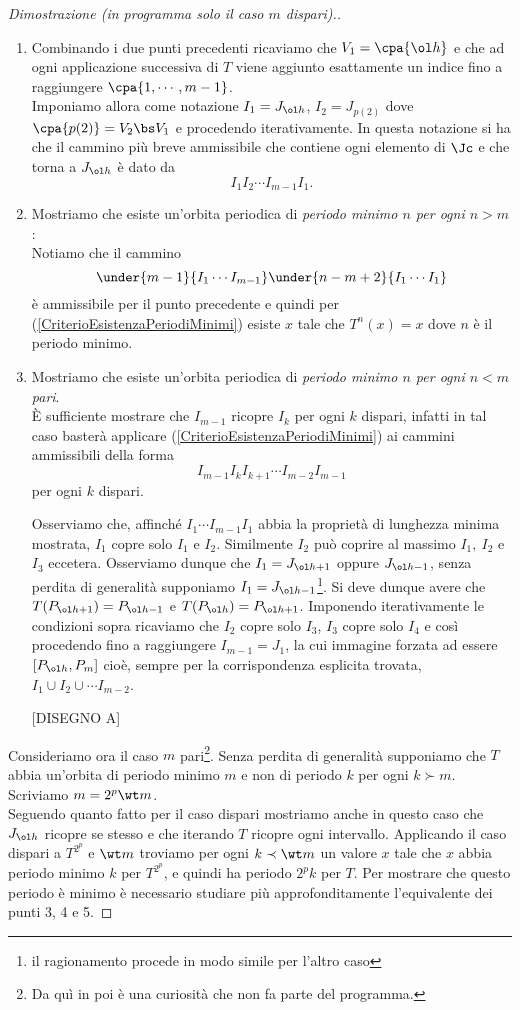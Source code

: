 \begin{proof}[Dimostrazione (in programma solo il caso $m$ dispari).]
\begin{enumerate}
\item Combinando i due punti precedenti ricaviamo che $V_1=\cpa{\ol h}$ e che ad ogni applicazione successiva di $T$ viene aggiunto esattamente un indice fino a raggiungere $\cpa{1,\cdots, m-1}$.\\
Imponiamo allora come notazione $I_1=J_{\ol h}$, $I_2=J_{p(2)}$ dove $\cpa{p(2)}=V_2\bs V_1$ e procedendo iterativamente. In questa notazione si ha che il cammino pi\`u breve ammissibile che contiene ogni elemento di $\Jc$ e che torna a $J_{\ol h}$ \`e dato da
\[I_1I_2\cdots I_{m-1}I_1.\]

\item Mostriamo che esiste un'orbita periodica di \textit{periodo minimo $n$ per ogni $n>m$}:\\
Notiamo che il cammino
\[\under{m-1}{I_1\cdots I_{m-1}}\under{n-m+2}{I_1\cdots I_1}\]
\`e ammissibile per il punto precedente e quindi per (\ref{CriterioEsistenzaPeriodiMinimi}) esiste $x$ tale che $T^{n}(x)=x$ dove $n$ \`e il periodo minimo.

\item Mostriamo che esiste un'orbita periodica di \textit{periodo minimo $n$ per ogni $n<m$ pari}.\\
\`E sufficiente mostrare che $I_{m-1}$ ricopre $I_k$ per ogni $k$ dispari, infatti in tal caso baster\`a applicare (\ref{CriterioEsistenzaPeriodiMinimi}) ai cammini ammissibili della forma
\[I_{m-1}I_k I_{k+1}\cdots I_{m-2}I_{m-1}\]
per ogni $k$ dispari.

Osserviamo che, affinch\'e $I_1\cdots I_{m-1}I_1$ abbia la propriet\`a di lunghezza minima mostrata, $I_1$ copre solo $I_1$ e $I_2$. Similmente $I_2$ pu\`o coprire al massimo $I_1,\ I_2$ e $I_3$ eccetera. Osserviamo dunque che $I_1=J_{\ol h+1}$ oppure $J_{\ol h-1}$, senza perdita di generalit\`a supponiamo $I_1=J_{\ol h-1}$\footnote{il ragionamento procede in modo simile per l'altro caso}. Si deve dunque avere che $T(P_{\ol h+1})=P_{\ol h-1}$ e $T(P_{\ol h})=P_{\ol h+1}$. Imponendo iterativamente le condizioni sopra ricaviamo che $I_2$ copre solo $I_3$, $I_3$ copre solo $I_4$ e cos\`i procedendo fino a raggiungere $I_{m-1}=J_{1}$, la cui immagine forzata ad essere $[P_{\ol h},P_m]$ cio\`e, sempre per la corrispondenza esplicita trovata, $I_1\cup I_2\cup \cdots I_{m-2}$.

[DISEGNO A]
\end{enumerate}
Consideriamo ora il caso $m$ pari\footnote{Da qu\`i in poi \`e una curiosit\`a che non fa parte del programma.}.
Senza perdita di generalit\`a supponiamo che $T$ abbia un'orbita di periodo minimo $m$ e non di periodo $k$ per ogni $k\succ m$. Scriviamo $m=2^p\wt m$.\\
Seguendo quanto fatto per il caso dispari mostriamo anche in questo caso che $J_{\ol h}$ ricopre se stesso e che iterando $T$ ricopre ogni intervallo. Applicando il caso dispari a $T^{2^p}$ e $\wt m$ troviamo per ogni $k\prec \wt m$ un valore $x$ tale che $x$ abbia periodo minimo $k$ per $T^{2^p}$, e quindi ha periodo $2^pk$ per $T$. Per mostrare che questo periodo \`e minimo \`e necessario studiare pi\`u approfonditamente l'equivalente dei punti 3, 4 e 5.
\end{proof}

